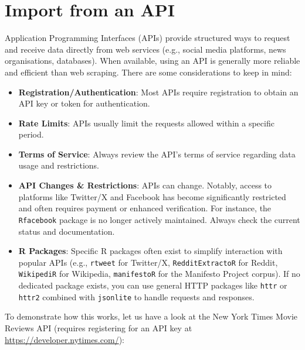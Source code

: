 \documentclass[
]{book}
\providecommand{\tightlist}{%
  \setlength{\itemsep}{0pt}\setlength{\parskip}{0pt}}
\begin{document}
\section{Import from an API}\label{import-from-an-api}

Application Programming Interfaces (APIs) provide structured ways to request and receive data directly from web services (e.g., social media platforms, news organisations, databases). When available, using an API is generally more reliable and efficient than web scraping. There are some considerations to keep in mind:

\begin{itemize}
\tightlist
\item
  \textbf{Registration/Authentication}: Most APIs require registration to obtain an API key or token for authentication.
\item
  \textbf{Rate Limits}: APIs usually limit the requests allowed within a specific period.
\item
  \textbf{Terms of Service}: Always review the API's terms of service regarding data usage and restrictions.
\item
  \textbf{API Changes \& Restrictions}: APIs can change. Notably, access to platforms like Twitter/X and Facebook has become significantly restricted and often requires payment or enhanced verification. For instance, the \texttt{Rfacebook} package is no longer actively maintained. Always check the current status and documentation.
\item
  \textbf{R Packages}: Specific R packages often exist to simplify interaction with popular APIs (e.g., \texttt{rtweet} for Twitter/X, \texttt{RedditExtractoR} for Reddit, \texttt{WikipediR} for Wikipedia, \texttt{manifestoR} for the Manifesto Project corpus). If no dedicated package exists, you can use general HTTP packages like \texttt{httr} or \texttt{httr2} combined with \texttt{jsonlite} to handle requests and responses.
\end{itemize}

To demonstrate how this works, let us have a look at the New York Times Movie Reviews API (requires registering for an API key at \url{https://developer.nytimes.com/}):
\end{document}
